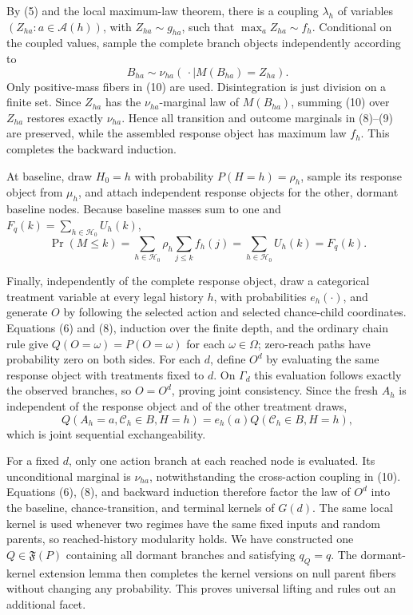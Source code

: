 By (5) and the local maximum-law theorem, there is a coupling \(\lambda_h\) of variables \((Z_{ha}:a\in\mathcal A(h))\), with \(Z_{ha}\sim g_{ha}\), such that \(\max_aZ_{ha}\sim f_h\).  Conditional on the coupled values, sample the complete branch objects independently according to
\[
 B_{ha}\sim\nu_{ha}(\,\cdot\mid M(B_{ha})=Z_{ha}).        \tag{10}
\]
Only positive-mass fibers in (10) are used.  Disintegration is just division on a finite set.  Since \(Z_{ha}\) has the \(\nu_{ha}\)-marginal law of \(M(B_{ha})\), summing (10) over \(Z_{ha}\) restores exactly \(\nu_{ha}\).  Hence all transition and outcome marginals in (8)--(9) are preserved, while the assembled response object has maximum law \(f_h\).  This completes the backward induction.

At baseline, draw \(H_0=h\) with probability \(P(H=h)=\rho_h\), sample its response object from \(\mu_h\), and attach independent response objects for the other, dormant baseline nodes.  Because baseline masses sum to one and \(F_q(k)=\sum_{h\in\mathcal H_0}U_h(k)\),
\[
 \Pr(M\leq k)=\sum_{h\in\mathcal H_0}\rho_h
       \sum_{j\leq k}f_h(j)
 =\sum_{h\in\mathcal H_0}U_h(k)=F_q(k).                  \tag{11}
\]

Finally, independently of the complete response object, draw a categorical treatment variable at every legal history \(h\), with probabilities \(e_h(\cdot)\), and generate \(O\) by following the selected action and selected chance-child coordinates.  Equations (6) and (8), induction over the finite depth, and the ordinary chain rule give \(Q(O=\omega)=P(O=\omega)\) for each \(\omega\in\Omega\); zero-reach paths have probability zero on both sides.  For each \(d\), define \(O^d\) by evaluating the same response object with treatments fixed to \(d\).  On \(\Gamma_d\) this evaluation follows exactly the observed branches, so \(O=O^d\), proving joint consistency.  Since the fresh \(A_h\) is independent of the response object and of the other treatment draws,
\[
 Q(A_h=a,\mathcal C_h\in B,H=h)
 =e_h(a)Q(\mathcal C_h\in B,H=h),                         \tag{12}
\]
which is joint sequential exchangeability.

For a fixed \(d\), only one action branch at each reached node is evaluated.  Its unconditional marginal is \(\nu_{ha}\), notwithstanding the cross-action coupling in (10).  Equations (6), (8), and backward induction therefore factor the law of \(O^d\) into the baseline, chance-transition, and terminal kernels of \(G(d)\).  The same local kernel is used whenever two regimes have the same fixed inputs and random parents, so reached-history modularity holds.  We have constructed one \(Q\in\mathfrak F(P)\) containing all dormant branches and satisfying \(q_Q=q\).  The dormant-kernel extension lemma then completes the kernel versions on null parent fibers without changing any probability.  This proves universal lifting and rules out an additional facet.

